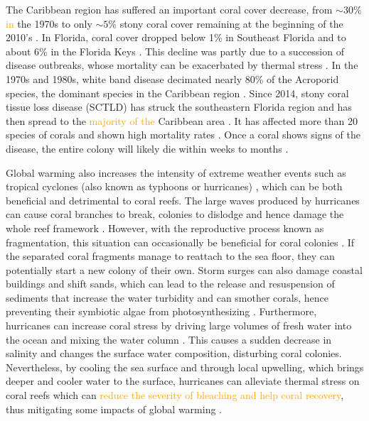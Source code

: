 \documentclass[fleqn,10pt]{wlscirep}
\newcommand{\modif}[1]{\textcolor{orange}{#1}}
\begin{document}
The Caribbean region has suffered an important coral cover decrease, from $\sim30$\% \modif{in} the 1970s to only $\sim5$\% stony coral cover remaining at the beginning of the 2010's  \citep{Porter1992Dec,Ruzicka2013Aug}. In Florida, coral cover dropped below 1\% in Southeast Florida and to about 6\% in the Florida Keys \cite{grove2022national}. This decline was partly due to a succession of disease outbreaks, whose mortality can be exacerbated by thermal stress \citep{muller2012caribbean,muller2018bleaching}. In the 1970s and 1980s, white band disease decimated nearly 80\% of the Acroporid species, the dominant species in the Caribbean region \citep{Kline2011,Aronson2001Sep}. Since 2014, stony coral tissue loss disease (SCTLD) has struck the southeastern Florida region and has then spread to the \modif{majority of the} Caribbean area \citep{Precht2016Aug}. It has affected more than 20 species of corals and shown high mortality rates \citep{Alvarez-Filip2022Jun}. Once a coral shows signs of the disease, the entire  colony will likely die within weeks to months \citep{NOAA2020Nov}.

Global warming also increases the intensity of extreme weather events such as tropical cyclones (also known as typhoons or hurricanes) \modif{\citep{Bhatia2019Feb, Knutson2020Mar}}, which can be both beneficial and detrimental to coral reefs. The large waves produced by hurricanes can cause coral branches to break, colonies to dislodge and hence damage the whole reef framework \citep{Scoffin1993Nov, Carter2022}. However, with the reproductive process known as fragmentation, this situation can occasionally be beneficial for coral colonies \citep{Bonin2011Jul}. If the separated coral fragments manage to reattach to the sea floor, they can potentially start a new colony of their own. Storm surges can also damage coastal buildings and shift sands, which can lead to the release and resuspension of sediments that increase the water turbidity and can smother corals, hence preventing their symbiotic algae from photosynthesizing \citep{Erftemeijer2012Sep, Jones2015Nov}. Furthermore, hurricanes can increase coral stress by driving large volumes of fresh water into the ocean and mixing the water column \citep{Allahdadi2017Apr}. This causes a sudden decrease in salinity and changes the surface water composition, disturbing coral colonies. Nevertheless, by cooling the sea surface and through local upwelling, which brings deeper and cooler water to the surface, hurricanes can alleviate thermal stress on coral reefs which can \modif{reduce the severity of bleaching and help coral recovery}, thus mitigating some impacts of global warming \citep{Aijaz2017May, Varlas2020Jul, carrigan2014tropical, Manzello2007Jul}.
\end{document}
